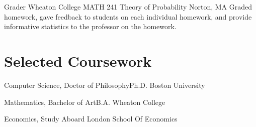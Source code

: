 \documentclass[11pt,roman]{moderncv}        %
\begin{document}
{Grader}
{Wheaton College MATH 241 Theory of Probability}
{Norton, MA}{}
{Graded homework, gave feedback to students on each individual homework,
and provide informative statistics to the professor on the homework.}


\section{Selected Coursework}

{Computer Science, \iftechnical Doctor of Philosophy\else Ph.D.\fi} {}
{Boston University} {} {}  %


{Mathematics, \iftechnical Bachelor of Art\else B.A.\fi} {}
{Wheaton College} {} {}

{Economics, Study Aboard} {}
{London School Of Economics} {} {}  %
\end{document}
